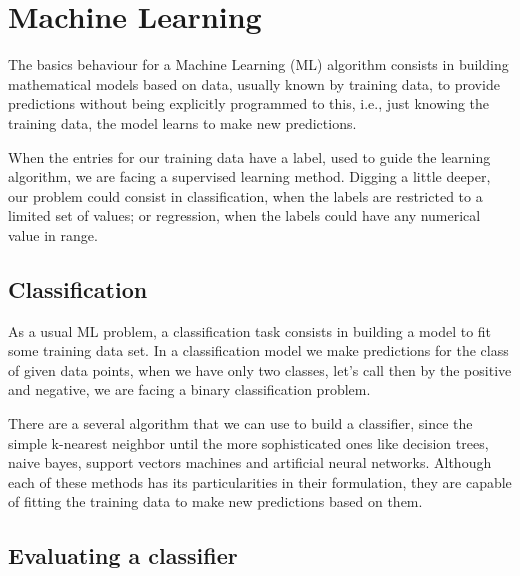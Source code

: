 \section{Machine Learning}
	
	The basics behaviour for a Machine Learning (ML) algorithm consists in building mathematical models based on data, usually known by training data, to provide predictions without being explicitly programmed to this, i.e., just knowing the training data, the model learns to make new predictions. 
	
	When the entries for our training data have a label, used to guide the learning algorithm, we are facing a supervised learning method. Digging a little deeper, our problem could consist in classification, when the labels are restricted to a limited set of values; or regression, when the labels could have any numerical value in range. 
		
	\subsection{Classification}
	
	As a usual ML problem, a classification task consists in building a model to fit some training data set. In a classification model we make predictions for the class of given data points, when we have only two classes, let's call then by the positive and negative, we are facing a binary classification problem.
	
	There are a several algorithm that we can use to build a classifier, since the simple k-nearest neighbor until the more sophisticated ones like decision trees, naive bayes, support vectors machines and artificial neural networks. Although each of these methods has its particularities in their formulation, they are capable of fitting the training data to make new predictions based on them.
	
	
		
	\subsection{Evaluating a classifier}
	
